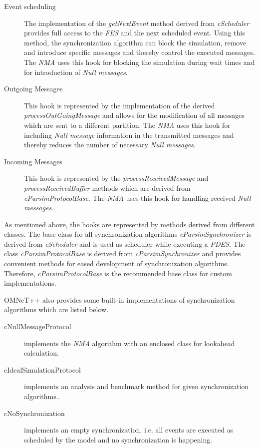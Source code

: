 \begin{description}
    \item[Event scheduling] The implementation of the \emph{getNextEvent} method derived from \emph{cScheduler} provides full access to the \emph{FES} and the next scheduled event.
    Using this method, the synchronization algorithm can block the simulation, remove and introduce specific messages and thereby control the executed messages.
    The \emph{NMA} uses this hook for blocking the simulation during wait times and for introduction of \emph{Null messages}.
    \item[Outgoing Messages] This hook is represented by the implementation of the derived \emph{processOutGoingMessage} and allows for the modification of all messages which are sent to a different partition.
    The \emph{NMA} uses this hook for including \emph{Null message} information in the transmitted messages and thereby reduces the number of necessary \emph{Null messages}.
    \item[Incoming Messages] This hook is represented by the \emph{processReceivedMessage} and \emph{processReceivedBuffer} methods which are derived from \emph{cParsimProtocolBase}.
    The \emph{NMA} uses this hook for handling received \emph{Null messages}.
\end{description}

As mentioned above, the hooks are represented by methods derived from different classes.
The base class for all synchronization algorithms \emph{cParsimSynchronizer} is derived from \emph{cScheduler} and is used as scheduler while executing a \emph{PDES}.
The class \emph{cParsimProtocolBase} is derived from \emph{cParsimSynchronizer} and provides convenient methods for eased development of synchronization algorithms.
Therefore, \emph{cParsimProtocolBase} is the recommended base class for custom implementations.

OMNeT++ also provides some built-in implementations of synchronization algorithms which are listed below. \cite[section 16.3.5]{omnet_manual}

\begin{description}
    \item[cNullMessageProtocol] implements the \emph{NMA} algorithm with an enclosed class for lookahead calculation.
    \item[cIdealSimulationProtocol] implements an analysis and benchmark method for given synchronization algorithms.\cite[section 3]{bagrodia_performance_2000}.
    \item[cNoSynchronization] implements an empty synchronization, i.e. all events are executed as scheduled by the model and no synchronization is happening.
\end{description}

